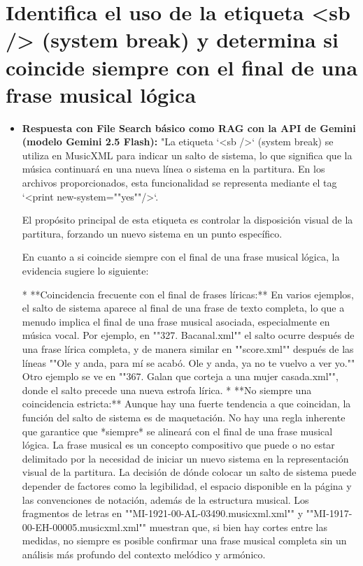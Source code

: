 \begin{itemize}

\end{itemize}

\section{Identifica el uso de la etiqueta <sb /> (system break) y determina si coincide siempre con el final de una frase musical lógica}
\begin{itemize}
    \item \textbf{Respuesta con File Search básico como RAG con la API de Gemini (modelo Gemini 2.5 Flash):} "La etiqueta `<sb />` (system break) se utiliza en MusicXML para indicar un salto de sistema, lo que significa que la música continuará en una nueva línea o sistema en la partitura. En los archivos proporcionados, esta funcionalidad se representa mediante el tag `<print new-system=""yes""/>`.

El propósito principal de esta etiqueta es controlar la disposición visual de la partitura, forzando un nuevo sistema en un punto específico.

En cuanto a si coincide siempre con el final de una frase musical lógica, la evidencia sugiere lo siguiente:

*   **Coincidencia frecuente con el final de frases líricas:** En varios ejemplos, el salto de sistema aparece al final de una frase de texto completa, lo que a menudo implica el final de una frase musical asociada, especialmente en música vocal. Por ejemplo, en ""327. Bacanal.xml"" el salto ocurre después de una frase lírica completa, y de manera similar en ""score.xml"" después de las líneas ""Ole y anda, para mí se acabó. Ole y anda, ya no te vuelvo a ver yo."" Otro ejemplo se ve en ""367. Galan que corteja a una mujer casada.xml"", donde el salto precede una nueva estrofa lírica.
*   **No siempre una coincidencia estricta:** Aunque hay una fuerte tendencia a que coincidan, la función del salto de sistema es de maquetación. No hay una regla inherente que garantice que *siempre* se alineará con el final de una frase musical lógica. La frase musical es un concepto compositivo que puede o no estar delimitado por la necesidad de iniciar un nuevo sistema en la representación visual de la partitura. La decisión de dónde colocar un salto de sistema puede depender de factores como la legibilidad, el espacio disponible en la página y las convenciones de notación, además de la estructura musical. Los fragmentos de letras en ""MI-1921-00-AL-03490.musicxml.xml"" y ""MI-1917-00-EH-00005.musicxml.xml"" muestran que, si bien hay cortes entre las medidas, no siempre es posible confirmar una frase musical completa sin un análisis más profundo del contexto melódico y armónico.


\end{itemize}
